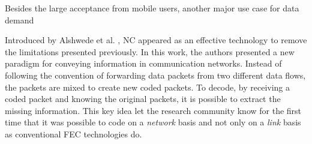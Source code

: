 Besides the large acceptance from mobile users, another major use case for data demand 

Introduced by Alshwede et al. \cite{ahlswede2000network}, \ac{NC} appeared as an effective technology to remove the limitations presented previously. In this work, the authors presented a new paradigm for conveying information in communication networks. Instead of following the convention of forwarding data packets from two different data flows, the packets are mixed to create new coded packets. To decode, by receiving a coded packet and knowing the original packets, it is possible to extract the missing information. This key idea let the research community know for the first time that it was possible to code on a \textit{network} basis and not only on a \textit{link} basis as conventional \ac{FEC} technologies do.

